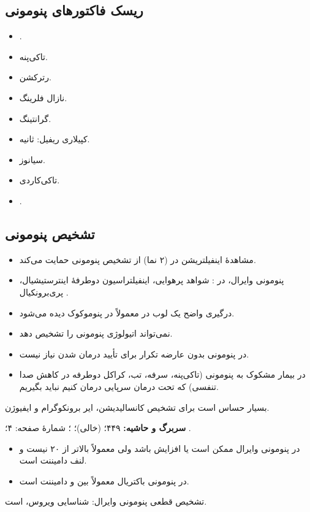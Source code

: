 \documentclass[12pt,a4paper]{article}
\begin{document}
\subsection*{ریسک فاکتورهای پنومونی }
\begin{itemize}
\item {}.
\item تاکی‌پنه.
\item رترکشن.
\item نازال فلرینگ.
\item گرانتینگ.
\item کپیلاری ریفیل:  ثانیه. 
\item سیانوز.
\item تاکی‌کاردی.
\item {}.
\end{itemize}
\subsection*{تشخیص پنومونی}
\begin{itemize}
\item مشاهدهٔ اینفیلتریشن در  (۲ نما) از تشخیص پنومونی حمایت می‌کند.
\item پنومونی وایرال، در : شواهد پرهوایی، اینفیلتراسیون دوطرفهٔ اینترستیشیال، پری‌برونکیال .
\item درگیری واضح یک لوب در  معمولاً در پنوموکوک دیده می‌شود.
\item {} نمی‌تواند اتیولوژی پنومونی را تشخیص دهد.
\item در پنومونی بدون عارضه تکرار  برای تأیید درمان شدن نیاز نیست.
\item در بیمار مشکوک به پنومونی (تاکی‌پنه، سرفه، تب، کراکل دوطرفه در کاهش صدا تنفسی) که تحت درمان سرپایی درمان کنیم نباید  بگیریم. 
\end{itemize}
 بسیار حساس است برای تشخیص کانسالیدیشن، ایر برونکوگرام و ایفیوژن.

\textbf{سربرگ و حاشیه:} ۴۴۹؛  (خالی)؛ ؛ شمارهٔ صفحه: ۴؛ .
\begin{itemize}
\item در پنومونی وایرال  ممکن است  یا افزایش باشد ولی معمولاً بالاتر از ۲۰ نیست و لنف دامیننت است.
\item در پنومونی باکتریال  معمولاً بین  و  دامیننت است. 
\end{itemize}
تشخیص قطعی پنومونی وایرال: شناسایی ویروس،  است.
\end{document}
